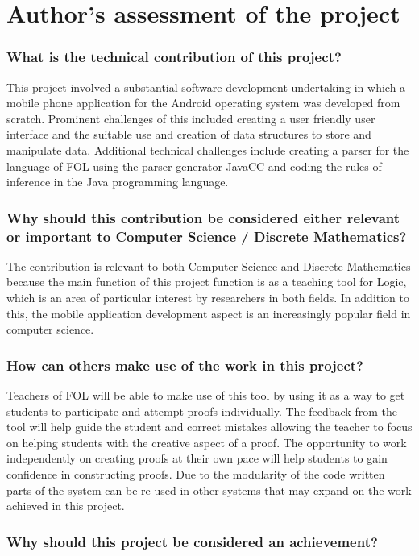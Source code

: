 \section{Author's assessment of the project}

\subsubsection*{What is the technical contribution of this project?}

\noindent This project involved a substantial software development undertaking in which a mobile phone application for the Android operating system was developed from scratch. Prominent challenges of this included creating a user friendly user interface and the suitable use and creation of data structures to store and manipulate data. Additional technical challenges include creating a parser for the language of FOL using the parser generator JavaCC  and coding the rules of inference in the Java programming language.
\subsubsection*{Why should this contribution be considered either relevant or important to Computer Science / Discrete Mathematics?}
The contribution is relevant to both Computer Science and Discrete Mathematics because the main function of this project function is as a teaching tool for Logic, which is an area of particular interest by researchers in both fields.
In addition to this, the mobile application development aspect is an increasingly popular field in computer science.

\subsubsection*{How can others make use of the work in this project?}
Teachers of FOL will be able to make use of this tool by using it as a way to get students to participate and attempt proofs individually. The feedback from the tool will help guide the student and correct mistakes allowing the teacher to focus on helping students with the creative aspect of a proof. The opportunity to work independently on creating proofs at their own pace will help students to gain confidence in constructing proofs.
Due to the modularity of the code written parts of the system can be re-used in other systems that may expand on the work achieved in this project.

\subsubsection*{Why should this project be considered an achievement?}

